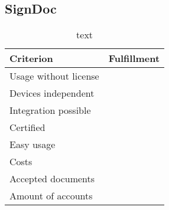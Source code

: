 \subsection{SignDoc}


\begin{table}[h]
	\begin{tabular}{|p{4cm}|p{10cm}|} \hline
		Criterion & Fulfillment \\ \hline
		Usage without license & \\ \hline
		Devices independent & \\ \hline
		Integration possible & \\ \hline
		Certified & \\ \hline
		Easy usage & \\ \hline
		Costs & \\ \hline
		Accepted documents & \\ \hline
		Amount of accounts & \\ \hline
	\end{tabular}
	\caption{text}
	\label{key}
\end{table}

